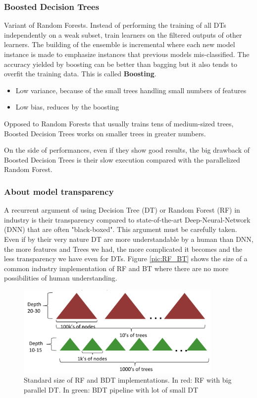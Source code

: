 \subsubsection{Boosted Decision Trees}
Variant of Random Forests. Instead of performing the training of all DTs independently on a weak subset, train learners on the filtered outputs of other learners. The building of the ensemble is incremental where each new model instance is made to emphasize instances that previous models mis-classified. The accuracy yielded by boosting can be better than bagging but it also tends to overfit the training data. 
This is called \textbf{Boosting}. 
\begin{itemize}
\item Low variance, because of the small trees handling small numbers of features
\item Low bias, reduces by the boosting
\end{itemize}

Opposed to Random Forests that usually trains tens of medium-sized trees, Boosted Decision Trees works on smaller trees in greater numbers.

On the side of performances, even if they show good results, the big drawback of Boosted Decision Trees is their slow execution compared with the parallelized Random Forest.

\subsubsection{About model transparency}

A recurrent argument of using Decision Tree (DT) or Random Forest (RF) in industry is their transparency compared to state-of-the-art Deep-Neural-Network (DNN) that are often "black-boxed". This argument must be carefully taken. Even if by their very nature DT are more understandable by a human than DNN, the more features and Trees we had, the more complicated it becomes and the less transparency we have even for DTs. Figure \ref{pic:RF_BT} shows the size of a common industry implementation of RF and BT where there are no more possibilities of human understanding.

\begin{figure}[H]%
 \centering
 \includegraphics[width=10cm]{./img/07/RF_BT.png}
 \caption{\label{pic:RF_BT.} Standard size of RF and BDT implementations.
 In red: RF with big parallel DT. In green: BDT pipeline with lot of small DT}
\end{figure}


